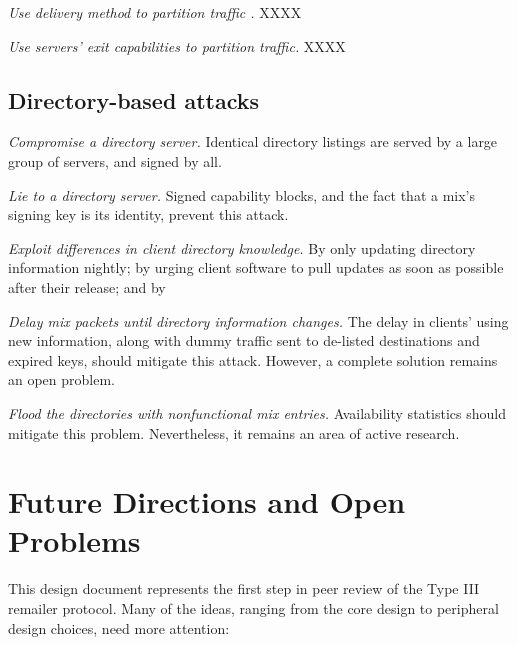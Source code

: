 \documentclass[11pt]{IEEEtran}
\begin{document}
\begin{description}
\item \emph{Use delivery method to partition traffic .} XXXX
\item \emph{Use servers' exit capabilities to partition traffic.} XXXX
\end{description}

\subsection{Directory-based attacks}
\label{subsec:attacks-dirbased}

\begin{description}
\item \emph{Compromise a directory server.} Identical directory listings
  are served by a large group of servers, and signed by all.
\item \emph{Lie to a directory server.}  Signed capability blocks, and
  the fact that a mix's signing key is its identity, prevent this
  attack.
\item \emph{Exploit differences in client directory knowledge.}  By
  only updating directory information nightly; by urging client
  software to pull updates as soon as possible after their release;
  and by 
\item \emph{Delay mix packets until directory information changes.}
  The delay in clients' using new information, along with dummy
  traffic sent to de-listed destinations and expired keys, should
  mitigate this attack. However, a complete solution remains an
  open problem.
\item \emph{Flood the directories with nonfunctional mix entries.}
  Availability statistics should mitigate this problem.  Nevertheless,
  it remains an area of active research. \cite{mix-acc,casc-rep}
\end{description}


\section{Future Directions and Open Problems}
\label{sec:conclusion}

This design document represents the first step in peer review of the
Type III remailer protocol. Many of the ideas, ranging from the core
design to peripheral design choices, need more attention:
\end{document}
